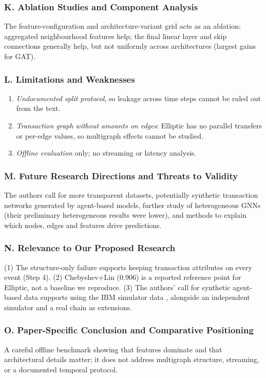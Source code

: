 \documentclass[11pt,a4paper]{article}
\begin{document}
\subsubsection*{K. Ablation Studies and Component Analysis}
The feature-configuration and architecture-variant grid acts as an ablation: aggregated neighbourhood features help; the final linear layer and skip connections generally help, but not uniformly across architectures (largest gains for GAT).

\subsubsection*{L. Limitations and Weaknesses}
\begin{enumerate}[leftmargin=*]
    \item \textit{Undocumented split protocol}, so leakage across time steps cannot be ruled out from the text.
    \item \textit{Transaction graph without amounts on edges}: Elliptic has no parallel transfers or per-edge values, so multigraph effects cannot be studied.
    \item \textit{Offline evaluation} only; no streaming or latency analysis.
\end{enumerate}

\subsubsection*{M. Future Research Directions and Threats to Validity}
The authors call for more transparent datasets, potentially synthetic transaction networks generated by agent-based models, further study of heterogeneous GNNs (their preliminary heterogeneous results were lower), and methods to explain which nodes, edges and features drive predictions.

\subsubsection*{N. Relevance to Our Proposed Research}
(1) The structure-only failure supports keeping transaction attributes on every event (Step 4). (2) Chebyshev+Lin (0.906) is a reported reference point for Elliptic, not a baseline we reproduce. (3) The authors' call for synthetic agent-based data supports using the IBM simulator data \cite{altman2023ibmaml}, alongside an independent simulator and a real chain as extensions.

\subsubsection*{O. Paper-Specific Conclusion and Comparative Positioning}
A careful offline benchmark showing that features dominate and that architectural details matter; it does not address multigraph structure, streaming, or a documented temporal protocol.
\end{document}
